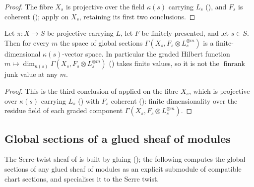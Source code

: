 \begin{proof}
  The fibre \(X_s\) is projective over the field \(\kappa(s)\) carrying \(L_s\)
  (), and \(F_s\) is coherent
  (); apply
   on \(X_s\), retaining its first two
  conclusions.
\end{proof}

\begin{lemma}
  \label{lem:hilbertFunction_finiteDimensional}
  \leanok
  Let \(\pi : X \to S\) be projective carrying \(L\), let \(F\) be finitely
  presented, and let \(s \in S\).  Then for every \(m\) the space of global
  sections \(\Gamma(X_s, F_s \otimes L_s^{\otimes m})\) is a finite-dimensional
  \(\kappa(s)\)-vector space.  In particular the graded Hilbert function
  \(m \mapsto \dim_{\kappa(s)} \Gamma(X_s, F_s \otimes L_s^{\otimes m})\)
  () takes finite values, so it is not the
  \(\operatorname{finrank}\) junk value at any \(m\).
\end{lemma}

\begin{proof}
  This is the third conclusion of  applied on
  the fibre \(X_s\), which is projective over \(\kappa(s)\) carrying \(L_s\)
  () with \(F_s\) coherent
  (): finite dimensionality over the
  residue field of each graded component
  \(\Gamma(X_s, F_s \otimes L_s^{\otimes m})\).
\end{proof}

\subsection{Global sections of a glued sheaf of modules}
\label{subsec:glue_gamma_compatible}

The Serre-twist sheaf of  is built by gluing
(); the following computes the global sections
of any glued sheaf of modules as an explicit submodule of compatible chart
sections, and specialises it to the Serre twist.

